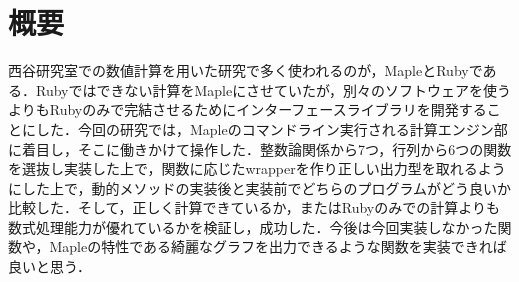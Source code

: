 \section{概要}
西谷研究室での数値計算を用いた研究で多く使われるのが，MapleとRubyである．Rubyではできない計算をMapleにさせていたが，別々のソフトウェアを使うよりもRubyのみで完結させるためにインターフェースライブラリを開発することにした．今回の研究では，Mapleのコマンドライン実行される計算エンジン部に着目し，そこに働きかけて操作した．整数論関係から7つ，行列から6つの関数を選抜し実装した上で，関数に応じたwrapperを作り正しい出力型を取れるようにした上で，動的メソッドの実装後と実装前でどちらのプログラムがどう良いか比較した．そして，正しく計算できているか，またはRubyのみでの計算よりも数式処理能力が優れているかを検証し，成功した．今後は今回実装しなかった関数や，Mapleの特性である綺麗なグラフを出力できるような関数を実装できれば良いと思う．

